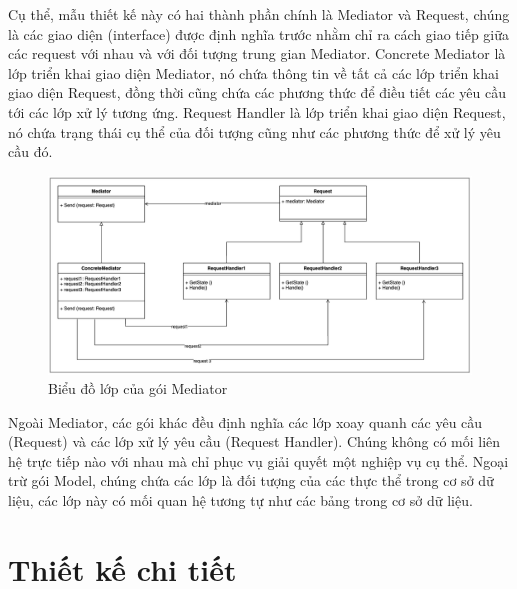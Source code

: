 \documentclass[../DoAn.tex]{subfiles}
\begin{document}
Cụ thể, mẫu thiết kế này có hai thành phần chính là Mediator và Request, chúng là các giao diện (interface) được định nghĩa trước nhằm chỉ ra cách
giao tiếp giữa các request với nhau và với đối tượng trung gian Mediator. Concrete Mediator là lớp triển khai giao diện Mediator, nó chứa thông tin về tất cả
các lớp triển khai giao diện Request, đồng thời cũng chứa các phương thức để điều tiết các yêu cầu tới các lớp xử lý tương ứng. Request Handler là lớp triển khai
giao diện Request, nó chứa trạng thái cụ thể của đối tượng cũng như các phương thức để xử lý yêu cầu đó.

\begin{figure}[H]
    \centering
    \includegraphics[width=1.0\linewidth]{Hinhve/ClassDiagram_Mediator.png}
    \caption{Biểu đồ lớp của gói Mediator}
    \label{fig:ClassDiagram_Mediator}
\end{figure}

Ngoài Mediator, các gói khác đều định nghĩa các lớp xoay quanh các yêu cầu (Request) và các lớp xử lý yêu cầu (Request Handler). Chúng không có mối liên hệ trực tiếp
nào với nhau mà chỉ phục vụ giải quyết một nghiệp vụ cụ thể. Ngoại trừ gói Model, chúng chứa các lớp là đối tượng của các thực thể trong cơ sở dữ liệu, các lớp này
có mối quan hệ tương tự như các bảng trong cơ sở dữ liệu.

\newpage


\section{Thiết kế chi tiết}
\label{section:4.2}
\end{document}
